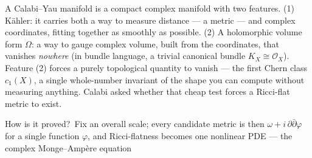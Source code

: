 \documentclass[12pt]{article}
\newcommand{\auterm}[1]{{\PosterSemibold #1}}
\newcommand{\PosterBody}{\fontsize{22.1}{30.1}\selectfont}
\begin{document}
%
\begin{minipage}[t][\BodyH][s]{0.35\textwidth}
\PosterBody

A \auterm{Calabi--Yau manifold} is a compact complex manifold with two
features. \auterm{(1) K\"ahler:} it carries both a way to measure
distance --- a metric --- and complex coordinates, fitting together as
smoothly as possible. \auterm{(2) A holomorphic volume form} $\Omega$:
a way to gauge complex volume, built from the coordinates, that
vanishes \emph{nowhere} (in bundle language, a trivial canonical
bundle $K_X \cong \mathcal{O}_X$). Feature (2) forces a purely
\auterm{topological} quantity to vanish --- the \auterm{first Chern
class} $c_1(X)$, a single whole-number invariant of the shape you can
compute without measuring anything. Calabi asked whether that cheap
test forces a Ricci-flat metric to exist.
\par\vspace{0.3em}
\begingroup
\setlength{\fboxsep}{0.62cm}\setlength{\fboxrule}{0.0pt}
\noindent{}
\endgroup
\vfill
\auterm{How is it proved?}\ Fix an overall scale; every candidate
metric is then $\omega + i\,\partial\bar\partial\varphi$ for a single
function $\varphi$, and Ricci-flatness becomes one nonlinear PDE ---
the \auterm{complex Monge--Amp\`ere equation}

\end{minipage}
\end{document}
